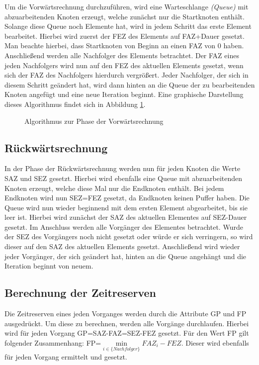 Um die Vorw\"artsrechnung durchzuf\"uhren, wird eine Warteschlange
\textit{(Queue)} mit
abzuarbeitenden Knoten erzeugt, welche zun\"achst nur die Startknoten
enth\"alt. Solange diese Queue noch Elemente hat, wird in jedem
Schritt das erste Element bearbeitet. Hierbei wird zuerst der FEZ des
Elements auf
FAZ+Dauer gesetzt. Man beachte hierbei, dass Startknoten von Beginn an
einen FAZ von 0 haben. Anschlie{\ss}end werden alle Nachfolger
des Elements betrachtet. Der FAZ eines jeden Nachfolgers wird nun auf
den FEZ des aktuellen Elements gesetzt, wenn sich der FAZ des
Nachfolgers hierdurch vergr\"o{\ss}ert. Jeder Nachfolger, der sich in
diesem Schritt ge\"andert hat, wird dann hinten
an die Queue der zu bearbeitenden Knoten angef\"ugt und eine neue
Iteration beginnt. Eine graphische Darstellung dieses Algorithmus
findet sich in Abbildung \ref{struktovorwaerts}.

\begin{figure}
  
  \caption{Algorithmus zur Phase der Vorw\"artsrechnung}
  \label{struktovorwaerts}
\end{figure}

\subsection{R\"uckw\"artsrechnung}

In der Phase der R\"uckw\"artsrechnung werden nun f\"ur jeden Knoten
die Werte SAZ und SEZ gesetzt. Hierbei wird ebenfalls
eine Queue mit abzuarbeitenden Knoten erzeugt, welche diese Mal nur
die Endknoten enth\"alt. Bei jedem Endknoten wird nun SEZ=FEZ gesetzt,
da Endknoten keinen Puffer haben. Die Queue wird nun wieder beginnend
mit dem ersten Element abgearbeitet, bis sie leer ist. Hierbei wird
zun\"achst der SAZ des aktuellen Elementes auf SEZ-Dauer gesetzt. Im
Anschluss werden alle Vorg\"anger des Elementes betrachtet. Wurde der
SEZ des Vorg\"angers noch nicht gesetzt oder w\"urde er sich
verringern, so wird dieser auf den SAZ des aktuellen Elements
gesetzt. Anschlie{\ss}end wird wieder jeder Vorg\"anger, der sich
ge\"andert hat, hinten an die
Queue angeh\"angt und die Iteration beginnt von neuem.

\subsection{Berechnung der Zeitreserven}

Die Zeitreserven eines jeden Vorganges werden durch die Attribute GP
und FP ausgedr\"uckt. Um diese zu berechnen, werden alle Vorg\"ange
durchlaufen. Hierbei wird f\"ur jeden Vorgang GP=SAZ-FAZ=SEZ-FEZ
gesetzt. F\"ur den Wert FP gilt folgender Zusammenhang:
FP=\(\min\limits_{i \in \{Nachfolger\}} FAZ_i - FEZ\). Dieser wird
ebenfalls f\"ur jeden Vorgang ermittelt und gesetzt.


